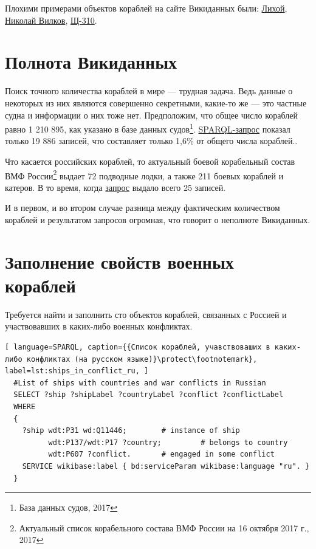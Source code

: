 Плохими примерами объектов кораблей на сайте Викиданных были: \href{https://www.wikidata.org/wiki/Q4264229}{Лихой}, \href{https://www.wikidata.org/wiki/Q18816894}{Николай Вилков}, \href{https://www.wikidata.org/wiki/Q4528362}{Щ-310}.

\section{Полнота Викиданных}

Поиск точного количества кораблей в мире — трудная задача. Ведь данные о некоторых из них являются совершенно секретными, какие-то же — это частные судна и информации о них тоже нет. Предположим, что общее число кораблей равно 1 210 895, как указано в базе данных судов\footnote{База данных судов, 2017}. \href{https://w.wiki/koU}{SPARQL-запрос} показал только 19 886 записей, что составляет только 1,6\% от общего числа кораблей..

Что касается российских кораблей, то актуальный боевой корабельный состав ВМФ России\footnote{Актуальный список корабельного состава ВМФ России на 16 октября 2017 г., 2017} выдает 72 подводные лодки, а также 211 боевых кораблей и катеров. В то время, когда \href{https://w.wiki/koS}{запрос} выдало всего 25 записей.

И в первом, и во втором случае разница между фактическим количеством кораблей и результатом запросов огромная, что говорит о неполноте Викиданных.


\section{Заполнение свойств военных кораблей}

Требуется найти и заполнить сто объектов кораблей, связанных с Россией и участвовавших в каких-либо военных конфликтах.


\begin{lstlisting}[ language=SPARQL, caption={{Список кораблей, учавствоваших в каких-либо конфликтах (на русском языке)}\protect\footnotemark}, label=lst:ships_in_conflict_ru, ]
  #List of ships with countries and war conflicts in Russian
  SELECT ?ship ?shipLabel ?countryLabel ?conflict ?conflictLabel
  WHERE
  {
    ?ship wdt:P31 wd:Q11446;        # instance of ship
          wdt:P137/wdt:P17 ?country;         # belongs to country
          wdt:P607 ?conflict.       # engaged in some conflict
    SERVICE wikibase:label { bd:serviceParam wikibase:language "ru". }
  }
\end{lstlisting}

